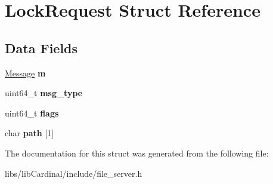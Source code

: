 \hypertarget{structLockRequest}{}\section{Lock\+Request Struct Reference}
\label{structLockRequest}
\subsection*{Data Fields}
\begin{DoxyCompactItemize}
\item 
\hyperlink{structMessage}{Message} {\bfseries m}\hypertarget{structLockRequest_aa4fc23bb29d7207255553488f183ea75}{}\label{structLockRequest_aa4fc23bb29d7207255553488f183ea75}

\item 
uint64\+\_\+t {\bfseries msg\+\_\+type}\hypertarget{structLockRequest_a676e17f21569c8848c1df289e715d31e}{}\label{structLockRequest_a676e17f21569c8848c1df289e715d31e}

\item 
uint64\+\_\+t {\bfseries flags}\hypertarget{structLockRequest_aef2bd7e39904f938219e8c6fdbd3a94d}{}\label{structLockRequest_aef2bd7e39904f938219e8c6fdbd3a94d}

\item 
char {\bfseries path} \mbox{[}1\mbox{]}\hypertarget{structLockRequest_a79ad15c796bbb918cf12c45b6fd41025}{}\label{structLockRequest_a79ad15c796bbb918cf12c45b6fd41025}

\end{DoxyCompactItemize}


The documentation for this struct was generated from the following file\+:\begin{DoxyCompactItemize}
\item 
libs/lib\+Cardinal/include/file\+\_\+server.\+h\end{DoxyCompactItemize}

